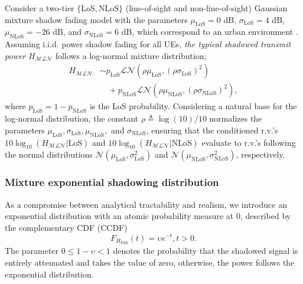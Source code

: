\documentclass[lettersize,journal]{IEEEtran}
\begin{document}
Consider a two-tier $\{\text{LoS},\text{NLoS}\}$ (line-of-sight and non-line-of-sight) Gaussian mixture shadow fading model with the parameters $\mu_{\text{LoS}} = 0$ dB, $\sigma_{\text{LoS}} = 4$ dB, $\mu_{\text{NLoS}} = -26$ dB, and $\sigma_{\text{NLoS}} = 6$ dB, which correspond to an urban environment \cite{TR38.811}. Assuming i.i.d. power shadow fading for all UEs, \textit{the typical shadowed transmit power} $H_{\mathcal{M}\mathcal{L}\mathcal{N}}$ follows a log-normal mixture distribution;
\begin{align}
  \label{eq:tier2lognormal}
  H_{\mathcal{M}\mathcal{L}\mathcal{N}} &\sim p_{\text{LoS}} \mathcal{L}\mathcal{N}(\rho \mu_{\text{LoS}}, (\rho \sigma_{\text{LoS}})^2) \nonumber \\
  &\quad + p_{\text{NLoS}} \mathcal{L}\mathcal{N}(\rho \mu_{\text{NLoS}}, (\rho \sigma_{\text{NLoS}})^2),
\end{align}
where $p_{\text{LoS}}=1-p_{\text{NLoS}}$ is the LoS probability. Considering a natural base for the log-normal distribution, the constant $\rho \triangleq \log(10)/10$ normalizes the parameters $\mu_{\text{LoS}}, \sigma_{\text{LoS}}, \mu_{\text{NLoS}},$ and $\sigma_{\text{NLoS}}$, ensuring that the conditioned r.v.'s $10 \log_{10}(H_{\mathcal{MLN}}|\text{LoS})$ and $10 \log_{10}(H_{\mathcal{MLN}}|\text{NLoS})$ evaluate to r.v.'s following the normal distributions $\mathcal{N}(\mu_{\text{LoS}}, \sigma_{\text{LoS}}^2)$ and $\mathcal{N}(\mu_{\text{NLoS}}, \sigma_{\text{NLoS}}^2)$, respectively.



\subsubsection{Mixture exponential shadowing distribution}
As a compromise between analytical tractability and realism, we introduce an exponential distribution with an atomic probability measure at $0$, described by the complementary CDF (CCDF)
\begin{equation}
  \label{eq:defexp}
  F_{{H}_{\text{Exp}}}(t) = \upsilon e^{-t}, t>0.
\end{equation}
 The parameter $0 \leq 1-\upsilon < 1$ denotes the probability that the shadowed signal is entirely attenuated and takes the value of zero, otherwise, the power follows the exponential distribution. 
\end{document}
